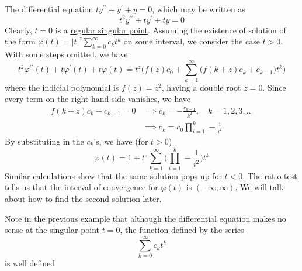\documentclass{article}
\newcounter{example}[section]
\begin{document}
      \begin{example}
        \label{ex:an-irregular-singular-point}
      The differential equation $t y^{\prime\prime} + y^\prime + y = 0$, which may be written as 
      \begin{equation}
        t^2 y^{\prime\prime} + t y^\prime + ty = 0
      \end{equation}
      Clearly, $t=0$ is a \hyperref[def:regular-singular-point]{regular singular point}. Assuming the existence of solution of the form $\varphi(t) = |t|^z \sum_{k=0}^\infty c_k t^k$ on some interval, we consider the case $t>0$. With some steps omitted, we have
      \begin{equation}
        t^2 \varphi^{\prime\prime} (t) + t \varphi^\prime (t) + t \varphi(t) = t^z \bigg( f(z) c_0 + \sum_{k=1}^\infty \big( f(k+z) c_k + c_{k-1} \big) t^k \bigg)
      \end{equation}
      where the indicial polynomial is $f(z) = z^2$, having a double root $z=0$. Since every term on the right hand side vanishes, we have
      \begin{align*}
          f(k+z) c_k + c_{k-1} = 0 & \implies c_k = -\frac{c_{k-1}}{k^2}, \quad k = 1, 2, 3, \ldots \\
          & \implies c_k = c_0 \prod_{i=1}^k -\frac{1}{i^2}
      \end{align*}
      By substituting in the $c_k$'s, we have (for $t>0$)
      \begin{equation}
        \varphi(t) = 1 + t^z \sum_{k=1}^\infty \bigg(\prod_{i=1}^k -\frac{1}{i^2}\bigg) t^k
      \end{equation}
      Similar calculations show that the same solution pops up for $t<0$. The \hyperref[real-thm:ratio-test]{ratio test} tells us that the interval of convergence for $\varphi(t)$ is $(-\infty, \infty)$. We will talk about how to find the second solution later. 
      \end{example}

      Note in the previous example that although the differential equation makes no sense at the \hyperref[def:singular-point]{singular point} $t = 0$, the function defined by the series 
      \begin{equation}
        \sum_{k=0}^\infty c_k t^k
      \end{equation}
      is well defined 
\end{document}
